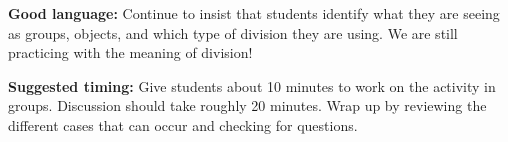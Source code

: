 \documentclass[nooutcomes,noauthor]{ximera}
\begin{document}
\begin{instructorNotes}
{\bf Good language:} Continue to insist that students identify what they are seeing as groups, objects, and which type of division they are using. We are still practicing with the meaning of division!

{\bf Suggested timing:} Give students about 10 minutes to work on the activity in groups. Discussion should take roughly 20 minutes. Wrap up by reviewing the different cases that can occur and checking for questions.




\end{instructorNotes}
\end{document}
